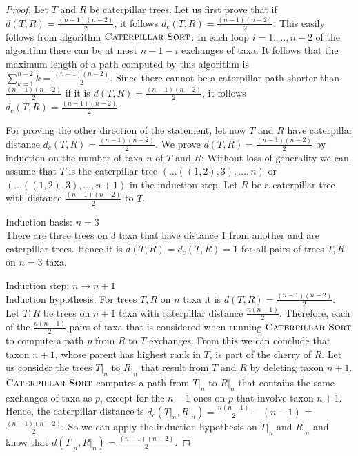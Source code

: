 \documentclass{amsart}
\newcommand{\csort}{\textsc{Caterpillar Sort}}
\begin{document}
\begin{proof}
    Let $T$ and $R$ be caterpillar trees.
    Let us first prove that if $d(T,R) = \frac{(n-1)(n-2)}{2}$, it follows $d_c(T,R) = \frac{(n-1)(n-2)}{2}$.
    This easily follows from algorithm $\csort$:
    In each loop $i=1, \ldots, n-2$ of the algorithm there can be at most $n-1-i$ exchanges of taxa.
    It follows that the maximum length of a path computed by this algorithm is $\sum\limits_{k=1}^{n-2} k = \frac{(n-1)(n-2)}{2}$.
    Since there cannot be a caterpillar path shorter than $\frac{(n-1)(n-2)}{2}$ if it is $d(T,R) = \frac{(n-1)(n-2)}{2}$, it follows $d_c(T,R) =  \frac{(n-1)(n-2)}{2}$.

    For proving the other direction of the statement, let now $T$ and $R$ have caterpillar distance $d_c(T,R) =  \frac{(n-1)(n-2)}{2}$.
    We prove $d(T,R) = \frac{(n-1)(n-2)}{2}$ by induction on the number of taxa $n$ of $T$ and $R$:
    Without loss of generality we can assume that $T$ is the caterpillar tree $(\ldots ((1,2),3), \ldots, n)$ or $(\ldots ((1,2),3), \ldots, n+1)$ in the induction step.
    Let $R$ be a caterpillar tree with distance $\frac{(n-1)(n-2)}{2}$ to $T$.

    Induction basis: $n=3$\\
    There are three trees on $3$ taxa that have distance $1$ from another and are caterpillar trees.
    Hence it is $d(T,R) = d_c(T,R) = 1$ for all pairs of trees $T,R$ on $n=3$ taxa.

    Induction step: $n \to n+1$\\
    Induction hypothesis: For trees $T, R$ on $n$ taxa it is $d(T, R) = \frac{(n-1)(n-2)}{2}$.\\
    Let $T, R$ be trees on $n+1$ taxa with caterpillar distance $\frac{n(n-1)}{2}$.
    Therefore, each of the $\frac{n(n-1)}{2}$ pairs of taxa that is considered when running $\csort$ to compute a path $p$ from $R$ to $T$ exchanges.
    From this we can conclude that taxon $n+1$, whose parent has highest rank in $T$, is part of the cherry of $R$. 
    Let us consider the trees $T{\big|}_n$ to $R{\big|}_n$ that result from $T$ and $R$ by deleting taxon $n+1$.
    $\csort$ computes a path from $T{\big|}_n$ to $R{\big|}_n$ that contains the same exchanges of taxa as $p$, except for the $n-1$ ones on $p$ that involve taxon $n+1$.
    Hence, the caterpillar distance is $d_c(T{\big|}_n, R{\big|}_n) = \frac{n(n-1)}{2} - (n-1)$ = $\frac{(n-1)(n-2)}{2}$.
    So we can apply the induction hypothesis on $T{\big|}_n$ and $R{\big|}_n$ and know that $d(T{\big|}_n,R{\big|}_n) = \frac{(n-1)(n-2)}{2}$.


\end{proof}
\end{document}
